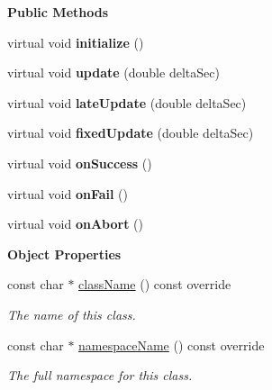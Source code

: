\begin{Indent}\textbf{ Public Methods}\par
\begin{DoxyCompactItemize}
\item 
\mbox{\label{classrev_1_1_script_behavior_adb27090a409f224d6a3fc2b9a56654c2}} 
virtual void {\bfseries initialize} ()
\item 
\mbox{\label{classrev_1_1_script_behavior_a35066924653f2bbed0ac3c153d9b5945}} 
virtual void {\bfseries update} (double delta\+Sec)
\item 
\mbox{\label{classrev_1_1_script_behavior_a0cfbd10bdf2d92cbe1684172d6786a6d}} 
virtual void {\bfseries late\+Update} (double delta\+Sec)
\item 
\mbox{\label{classrev_1_1_script_behavior_a8547152c6bcf7397a859cb483a27c785}} 
virtual void {\bfseries fixed\+Update} (double delta\+Sec)
\item 
\mbox{\label{classrev_1_1_script_behavior_a6b676b7f39fade5f6a990b1fa69bc875}} 
virtual void {\bfseries on\+Success} ()
\item 
\mbox{\label{classrev_1_1_script_behavior_a17cc8809c4262052a163027c55164798}} 
virtual void {\bfseries on\+Fail} ()
\item 
\mbox{\label{classrev_1_1_script_behavior_ac44a8fbb02add6a17a664ec4d66882d8}} 
virtual void {\bfseries on\+Abort} ()
\end{DoxyCompactItemize}
\end{Indent}
\begin{Indent}\textbf{ Object Properties}\par
\begin{DoxyCompactItemize}
\item 
const char $\ast$ \mbox{\hyperlink{classrev_1_1_script_behavior_abb2e3df30c7fdb8ad6b81459b14c4906}{class\+Name}} () const override
\begin{DoxyCompactList}\small\item\em The name of this class. \end{DoxyCompactList}\item 
const char $\ast$ \mbox{\hyperlink{classrev_1_1_script_behavior_a5296bd41ce1593182019f8be6628eada}{namespace\+Name}} () const override
\begin{DoxyCompactList}\small\item\em The full namespace for this class. \end{DoxyCompactList}\end{DoxyCompactItemize}
\end{Indent}
